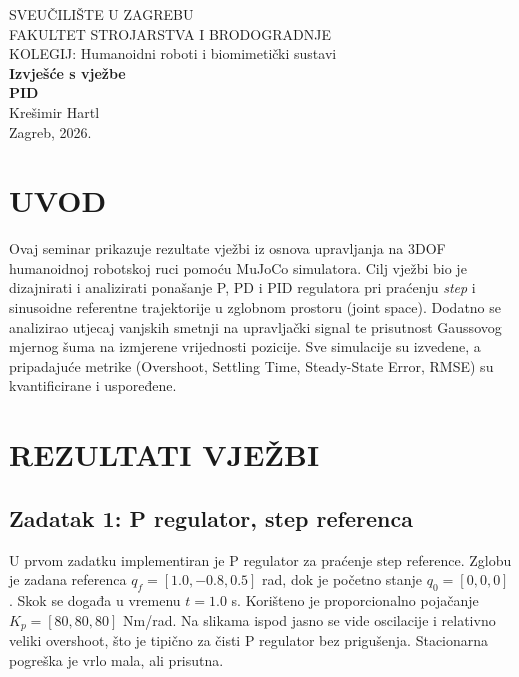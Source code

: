 \documentclass[12pt,a4paper]{article}
\begin{document}
\begin{titlepage}
    \begin{center}
        {\large SVEUČILIŠTE U ZAGREBU} \\
        {\large FAKULTET STROJARSTVA I BRODOGRADNJE} \\
        \vspace{6cm}
        {\large KOLEGIJ: Humanoidni roboti i biomimetički sustavi} \\
        \vspace{2cm}
        {\Huge \textbf{Izvješće s vježbe}} \\
        \vspace{1cm}
        {\Large \textbf{PID}} \\
        \vfill
        {\large Krešimir Hartl} \\
        \vspace{2cm}
        {\large Zagreb, 2026.}
    \end{center}
\end{titlepage}

\tableofcontents
\newpage
\listoffigures
\newpage
\listoftables
\newpage

\section{UVOD}
Ovaj seminar prikazuje rezultate vježbi iz osnova upravljanja na 3DOF humanoidnoj robotskoj ruci pomoću MuJoCo simulatora. Cilj vježbi bio je dizajnirati i analizirati ponašanje P, PD i PID regulatora pri praćenju \textit{step} i sinusoidne referentne trajektorije u zglobnom prostoru (joint space). Dodatno se analizirao utjecaj vanjskih smetnji na upravljački signal te prisutnost Gaussovog mjernog šuma na izmjerene vrijednosti pozicije. Sve simulacije su izvedene, a pripadajuće metrike (Overshoot, Settling Time, Steady-State Error, RMSE) su kvantificirane i uspoređene.

\section{REZULTATI VJEŽBI}

\subsection{Zadatak 1: P regulator, step referenca}
U prvom zadatku implementiran je P regulator za praćenje step reference. Zglobu je zadana referenca $q_f = [1.0, -0.8, 0.5]$ rad, dok je početno stanje $q_0 = [0, 0, 0]$. Skok se događa u vremenu $t = 1.0$ s. Korišteno je proporcionalno pojačanje $K_p = [80, 80, 80]$ Nm/rad. Na slikama ispod jasno se vide oscilacije i relativno veliki overshoot, što je tipično za čisti P regulator bez prigušenja. Stacionarna pogreška je vrlo mala, ali prisutna.
\end{document}
